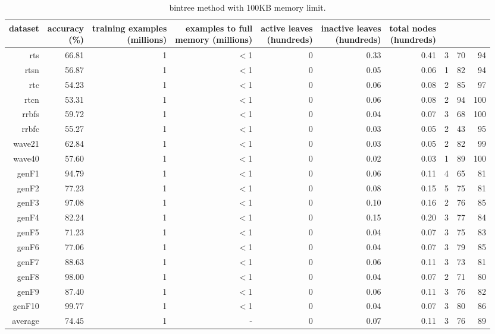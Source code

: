 \clearpage
\begin{table}
\caption{{\sc bintree} method with 100KB memory limit.}
\label{tab:bintree-100k}
\centering
\begin{tabular}{|r|r|r|r|r|r|r|r|r|r|}
\hline
dataset	&
\rotatebox{90}{\parbox{9em}{accuracy\\(\%)}} &
\rotatebox{90}{\parbox{9em}{training examples\\(millions)}} &
\rotatebox{90}{\parbox{9em}{examples to full\\memory (millions)}} &
\rotatebox{90}{\parbox{9em}{active leaves\\(hundreds)}} &
\rotatebox{90}{\parbox{9em}{inactive leaves\\(hundreds)}} &
\rotatebox{90}{\parbox{9em}{total nodes\\(hundreds)}} &
\rotatebox{90}{\parbox{9em}{tree depth}}	&
\rotatebox{90}{\parbox{9em}{training speed (\%)}} &
\rotatebox{90}{\parbox{9em}{prediction speed (\%)}} \\
\hline
{\sc rts} & 66.81 & 1 & $<$1 & 0 & 0.33 & 0.41 & 3 & 70 & 94 \\
{\sc rtsn} & 56.87 & 1 & $<$1 & 0 & 0.05 & 0.06 & 1 & 82 & 94 \\
{\sc rtc} & 54.23 & 1 & $<$1 & 0 & 0.06 & 0.08 & 2 & 85 & 97 \\
{\sc rtcn} & 53.31 & 1 & $<$1 & 0 & 0.06 & 0.08 & 2 & 94 & 100 \\
{\sc rrbfs} & 59.72 & 1 & $<$1 & 0 & 0.04 & 0.07 & 3 & 68 & 100 \\
{\sc rrbfc} & 55.27 & 1 & $<$1 & 0 & 0.03 & 0.05 & 2 & 43 & 95 \\
{\sc wave21} & 62.84 & 1 & $<$1 & 0 & 0.03 & 0.05 & 2 & 82 & 99 \\
{\sc wave40} & 57.60 & 1 & $<$1 & 0 & 0.02 & 0.03 & 1 & 89 & 100 \\
{\sc genF1} & 94.79 & 1 & $<$1 & 0 & 0.06 & 0.11 & 4 & 65 & 81 \\
{\sc genF2} & 77.23 & 1 & $<$1 & 0 & 0.08 & 0.15 & 5 & 75 & 81 \\
{\sc genF3} & 97.08 & 1 & $<$1 & 0 & 0.10 & 0.16 & 2 & 76 & 85 \\
{\sc genF4} & 82.24 & 1 & $<$1 & 0 & 0.15 & 0.20 & 3 & 77 & 84 \\
{\sc genF5} & 71.23 & 1 & $<$1 & 0 & 0.04 & 0.07 & 3 & 75 & 83 \\
{\sc genF6} & 77.06 & 1 & $<$1 & 0 & 0.04 & 0.07 & 3 & 79 & 85 \\
{\sc genF7} & 88.63 & 1 & $<$1 & 0 & 0.06 & 0.11 & 3 & 73 & 81 \\
{\sc genF8} & 98.00 & 1 & $<$1 & 0 & 0.04 & 0.07 & 2 & 71 & 80 \\
{\sc genF9} & 87.40 & 1 & $<$1 & 0 & 0.06 & 0.11 & 3 & 76 & 82 \\
{\sc genF10} & 99.77 & 1 & $<$1 & 0 & 0.04 & 0.07 & 3 & 80 & 86 \\
\hline
average & 74.45 & 1 &  -  & 0 & 0.07 & 0.11 & 3 & 76 & 89 \\
\hline
\end{tabular}
\end{table}
